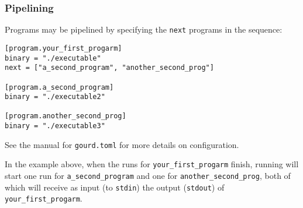 \documentclass[a4paper,english]{article}
\begin{document}
\begin{adjustwidth}{18pt}{0pt}
            \subsubsection{Pipelining}
                Programs may be pipelined by specifying the \texttt{next} programs in the sequence:
                \begin{verbatim}
[program.your_first_progarm]
binary = "./executable"
next = ["a_second_program", "another_second_prog"]

[program.a_second_program]
binary = "./executable2"

[program.another_second_prog]
binary = "./executable3"
                \end{verbatim}
                See the manual for \texttt{gourd.toml} for more details on configuration.

                In the example above, when the runs for \texttt{your\_first\_progarm} finish, running
                  will start one run for \texttt{a\_second\_program} and one for
                \texttt{another\_second\_prog}, both of which will receive as input (to \texttt{stdin}) the
                output (\texttt{stdout}) of \texttt{your\_first\_progarm}.


\end{adjustwidth}
\end{document}
